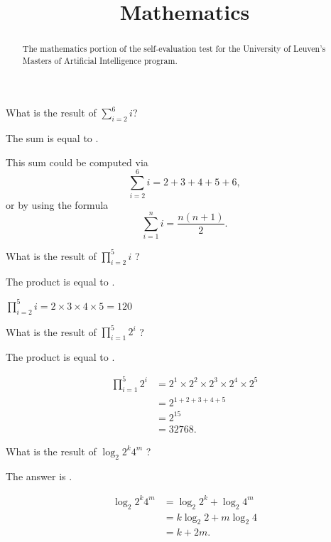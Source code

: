 \documentclass{ximera}
\title{Mathematics}
\begin{document}
\begin{abstract}
The mathematics portion of the self-evaluation test for the University
of Leuven's Masters of Artificial Intelligence program.
\end{abstract}
\maketitle

\begin{question}
What is the result of $\sum_{i=2}^6 i$?
\begin{solution}
The sum is equal to .
\end{solution}
This sum could be computed via
\[
\sum_{i=2}^6 i = 2 + 3 + 4 + 5 + 6,
\]
or by using the formula
\[
\sum_{i=1}^n i = \frac{n(n+1)}{2}.
\]
\end{question}

\begin{question}
What is  the result of $\prod_{i=2}^{5} i$ ? 
\begin{solution}
The product is equal to .
\end{solution}
$\prod_{i=2}^5 i = 2 \times 3 \times 4 \times 5 = 120$
\end{question}

\begin{question}
What is  the result of  $\prod_{i=1}^5 2^i$  ? 
\begin{solution}
The product is equal to .
\end{solution}
\begin{align*}
\prod_{i=1}^5 2^i &= 2^1 \times 2^2 \times 2^3 \times 2^4 \times 2^5 \\
&= 2^{1 + 2 + 3 + 4 + 5} \\
&= 2^{15} \\
&= 32768. 
\end{align*}
\end{question}

\begin{question}
What is  the result of  $\log_2 2^k 4^m$  ? 
\begin{solution}
The answer is .
\end{solution}
\begin{align*}
\log_2{2^k 4^m} &= \log_2{2^k} + \log_2{4^m} \\
&= k \log_2{2} + m \log_2{4} \\
&= k + 2m.
\end{align*}
\end{question}
\end{document}
